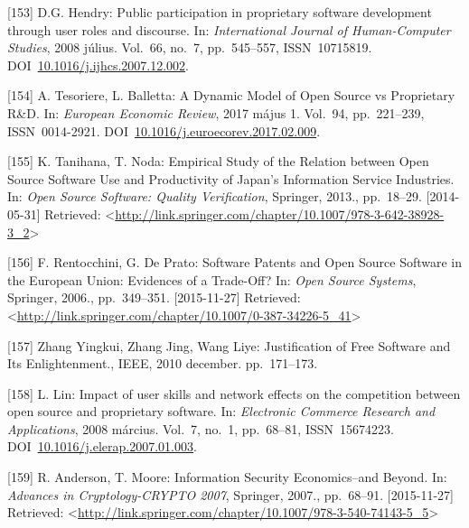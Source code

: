 \documentclass[12pt,magyar,a4paper,oneside]{scrreprt}
\begin{document}
\leavevmode\hypertarget{ref-hendry_public_2008}{}%
{[}153{]} D.G. Hendry: Public participation in proprietary software
development through user roles and discourse. In: \emph{International
Journal of Human-Computer Studies}, 2008 július. Vol.~66, no.~7,
pp.~545--557, ISSN~10715819.
DOI~\href{https://doi.org/10.1016/j.ijhcs.2007.12.002}{10.1016/j.ijhcs.2007.12.002}.

\leavevmode\hypertarget{ref-tesoriere_dynamic_2017}{}%
{[}154{]} A. Tesoriere, L. Balletta: A Dynamic Model of Open Source vs
Proprietary R\&D. In: \emph{European Economic Review}, 2017 május 1.
Vol.~94, pp.~221--239, ISSN~0014-2921.
DOI~\href{https://doi.org/10.1016/j.euroecorev.2017.02.009}{10.1016/j.euroecorev.2017.02.009}.

\leavevmode\hypertarget{ref-tanihana_empirical_2013}{}%
{[}155{]} K. Tanihana, T. Noda: Empirical Study of the Relation between
Open Source Software Use and Productivity of Japan's Information Service
Industries. In: \emph{Open Source Software: Quality Verification},
Springer, 2013., pp.~18--29. {[}2014-05-31{]} Retrieved:
\textless{}\url{http://link.springer.com/chapter/10.1007/978-3-642-38928-3_2}\textgreater{}

\leavevmode\hypertarget{ref-rentocchini_software_2006}{}%
{[}156{]} F. Rentocchini, G. De Prato: Software Patents and Open Source
Software in the European Union: Evidences of a Trade-Off? In: \emph{Open
Source Systems}, Springer, 2006., pp.~349--351. {[}2015-11-27{]}
Retrieved:
\textless{}\url{http://link.springer.com/chapter/10.1007/0-387-34226-5_41}\textgreater{}

\leavevmode\hypertarget{ref-zhang_yingkui_justification_2010}{}%
{[}157{]} Zhang Yingkui, Zhang Jing, Wang Liye: Justification of Free
Software and Its Enlightenment., IEEE, 2010 december. pp.~171--173.

\leavevmode\hypertarget{ref-lin_impact_2008}{}%
{[}158{]} L. Lin: Impact of user skills and network effects on the
competition between open source and proprietary software. In:
\emph{Electronic Commerce Research and Applications}, 2008 március.
Vol.~7, no.~1, pp.~68--81, ISSN~15674223.
DOI~\href{https://doi.org/10.1016/j.elerap.2007.01.003}{10.1016/j.elerap.2007.01.003}.

\leavevmode\hypertarget{ref-anderson_information_2007}{}%
{[}159{]} R. Anderson, T. Moore: Information Security Economics--and
Beyond. In: \emph{Advances in Cryptology-CRYPTO 2007}, Springer, 2007.,
pp.~68--91. {[}2015-11-27{]} Retrieved:
\textless{}\url{http://link.springer.com/chapter/10.1007/978-3-540-74143-5_5}\textgreater{}
\end{document}
